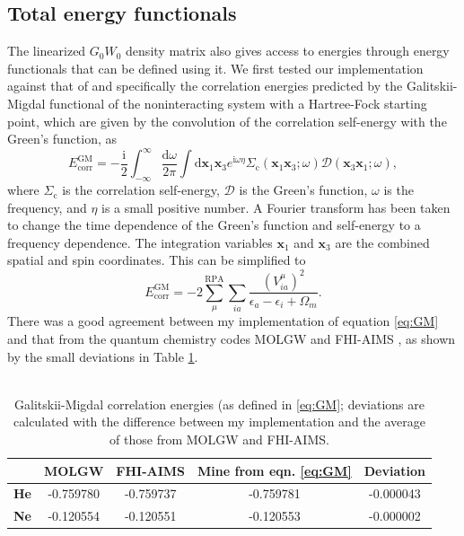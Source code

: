 \documentclass[12pt]{caltech_thesis}
\begin{document}
\subsection{Total energy functionals}
\label{chap:total_energy}
The linearized $G_0W_0$ density matrix also gives access to energies through energy functionals that can be defined using it. We first tested our implementation against that of \textcite{bruneval_improved_2021} and specifically the correlation energies predicted by the Galitskii-Migdal functional of the noninteracting system with a Hartree-Fock starting point, which are given by the convolution of the correlation self-energy with the Green's function, as
\begin{equation}
E_{\mathrm{corr}}^{\mathrm{GM}}=-\frac{\mathrm{i}}{2} \int_{-\infty}^{\infty} \frac{\mathrm{d} \omega}{2 \pi} \int \mathrm{d} \boldsymbol{x}_1 \boldsymbol{x}_3 e^{\mathrm{i} \omega \eta} \Sigma_{\mathrm{c}}\left(\boldsymbol{x}_1 \boldsymbol{x}_3 ; \omega\right) \mathcal{D}\left(\boldsymbol{x}_3 \boldsymbol{x}_1 ; \omega\right),
\end{equation}
where $\Sigma_{\mathrm{c}}$ is the correlation self-energy, $\mathcal{D}$ is the Green's function, $\omega$ is the frequency, and $\eta$ is a small positive number. A Fourier transform has been taken to change the time dependence of the Green's function and self-energy to a frequency dependence. The integration variables $\boldsymbol{x}_1$ and $\boldsymbol{x}_3$ are the combined spatial and spin coordinates.
This can be simplified to
\begin{equation}
E_{\mathrm{corr}}^{\mathrm{GM}}=-2\sum_{\mu}^{\mathrm{RPA}} \sum_{i a} \frac{(V_{ia}^{\mu})^2}{\epsilon_a-\epsilon_i+\Omega_m}.
\label{eq:GM}
\end{equation}
There was a good agreement between my implementation of equation \ref{eq:GM} and that from the quantum chemistry codes MOLGW and FHI-AIMS \autocite{bruneval_improved_2021}, as shown by the small deviations in Table \ref{tab:galitskii}.\\\\
\begin{table}[h!]
    \centering
    \caption{Galitskii-Migdal correlation energies (as defined in \ref{eq:GM}; deviations are calculated with the difference between my implementation and the average of those from MOLGW and FHI-AIMS.}
    \begin{tabular}{lcccc}
        \toprule
        & \textbf{MOLGW} & \textbf{FHI-AIMS} & \textbf{Mine from eqn. \ref{eq:GM}} & \textbf{Deviation} \\
        \midrule
        \textbf{He} & -0.759780 & -0.759737 & -0.759781 & -0.000043 \\
        \textbf{Ne} & -0.120554 & -0.120551 & -0.120553 & -0.000002 \\
        \bottomrule
    \end{tabular}
    \label{tab:galitskii}
\end{table}
\end{document}
